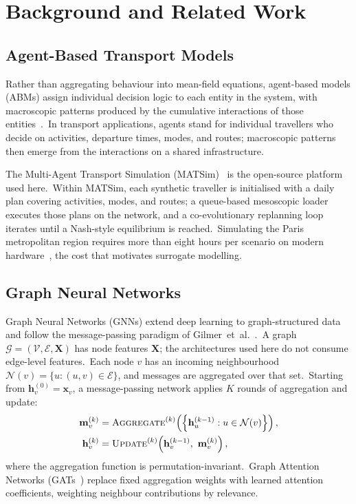 
\chapter{Background and Related Work}\label{chapter:background}

\section{Agent-Based Transport Models}\label{sec:abm}

Rather than aggregating behaviour into mean-field equations, agent-based models (ABMs) assign individual decision logic to each entity in the system, with macroscopic patterns produced by the cumulative interactions of those entities~\cite{bonabeau2002agent,railsback2019agent}.\ In transport applications, agents stand for individual travellers who decide on activities, departure times, modes, and routes; macroscopic patterns then emerge from the interactions on a shared infrastructure.

The Multi-Agent Transport Simulation (MATSim)~\cite{horni2016matsim} is the open-source platform used here.\ Within MATSim, each synthetic traveller is initialised with a daily plan covering activities, modes, and routes; a queue-based mesoscopic loader executes those plans on the network, and a co-evolutionary replanning loop iterates until a Nash-style equilibrium is reached.\ Simulating the Paris metropolitan region requires more than eight hours per scenario on modern hardware~\cite{natterer2025ml}, the cost that motivates surrogate modelling.

\section{Graph Neural Networks}\label{sec:gnn}

Graph Neural Networks (GNNs) extend deep learning to graph-structured data~\cite{scarselli2009graph,kipf2017semi,wu2020comprehensive,wu2022graph} and follow the message-passing paradigm of Gilmer~et~al.~\cite{gilmer2017neural}.\ A graph $\mathcal{G} = (\mathcal{V}, \mathcal{E}, \mathbf{X})$ has node features $\mathbf{X}$; the architectures used here do not consume edge-level features.\ Each node $v$ has an incoming neighbourhood $\mathcal{N}(v) = \{u : (u,v) \in \mathcal{E}\}$, and messages are aggregated over that set.\ Starting from $\mathbf{h}_v^{(0)} = \mathbf{x}_v$, a message-passing network applies $K$ rounds of aggregation and update:
\begin{align}
 \mathbf{m}_v^{(k)} &= \textsc{Aggregate}^{(k)}\!\left(\left\{\mathbf{h}_u^{(k-1)} : u \in \mathcal{N}(v)\right\}\right), \label{eq:aggregate}\\
 \mathbf{h}_v^{(k)} &= \textsc{Update}^{(k)}\!\left(\mathbf{h}_v^{(k-1)},\ \mathbf{m}_v^{(k)}\right), \label{eq:update}
\end{align}
where the aggregation function is permutation-invariant.\ Graph Attention Networks (GATs~\cite{velickovic2018graph}) replace fixed aggregation weights with learned attention coefficients, weighting neighbour contributions by relevance.

